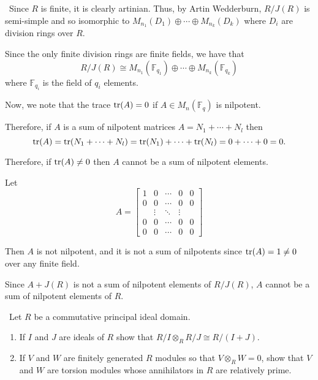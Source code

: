 \documentclass[12pt]{Qual}
\begin{document}
\begin{solution}$\,$
Since $R$ is finite, it is clearly artinian. Thus, by Artin Wedderburn, $R/J(R)$ is semi-simple and so isomorphic to $M_{n_1}(D_1)\oplus\cdots\oplus M_{n_k}(D_k)$ where $D_i$ are division rings over $R$.

Since the only finite division rings are finite fields, we have that $$R/J(R)\cong M_{n_1}(\mathbb{F}_{q_1})\oplus\cdots\oplus  M_{n_k}(\mathbb{F}_{q_k})$$ where $\mathbb{F}_{q_i}$ is the field of $q_i$ elements.

Now, we note that the trace $\text{tr}(A)=0$ if $A\in M_n(\mathbb{F}_q)$ is nilpotent.

Therefore, if $A$ is a sum of nilpotent matrices $A=N_1+\cdots+N_l$ then $$\text{tr}(A)=\text{tr}(N_1+\cdots+N_l)=\text{tr}(N_1)+\cdots+\text{tr}(N_l)=0+\cdots+0=0.$$

Therefore, if $\text{tr}(A)\not=0$ then $A$ cannot be a sum of nilpotent elements.

Let $$A=\begin{bmatrix}
1 & 0 & \cdots & 0 & 0\\
0 & 0 &\cdots & 0 & 0\\
& \vdots & \ddots & \vdots & \\
0 & 0 & \cdots & 0 & 0\\
0 & 0 & \cdots & 0 & 0
\end{bmatrix}$$

Then $A$ is not nilpotent, and it is not a sum of nilpotents since $\text{tr}(A)=1\not=0$ over any finite field.

Since $A+J(R)$ is not a sum of nilpotent elements of $R/J(R)$, $A$ cannot be a sum of nilpotent elements of $R.$
\end{solution}
\newpage




\begin{problem} $\,$
Let $R$ be a commutative principal ideal domain.
\begin{enumerate}[label=(\alph*)]
    \item If $I$ and $J$ are ideals of $R$ show that $R/I\otimes_R R/J\cong R/(I+J)$.
    \item If $V$ and $W$ are finitely generated $R$ modules so that $V\otimes_RW=0$, show that $V$ and $W$ are torsion modules whose annihilators in $R$ are relatively prime.
\end{enumerate}
\end{problem}
\end{document}
